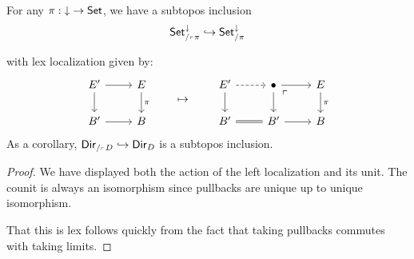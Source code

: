 \begin{thm}
  For any $\pi : \mathbin{\downarrow} \to \operatorname{\mathsf{{Set}}}$, we have a subtopos inclusion
  $$\operatorname{\mathsf{{Set}}}^{\mathbin{\downarrow}}_{/_{\ulcorner} \pi} \hookrightarrow \operatorname{\mathsf{{Set}}}^{\mathbin{\downarrow}}_{/\pi}$$

  with lex localization given by:
  \[
\begin{tikzcd}
E' \arrow[r] \arrow[d] & E \arrow[d, "\pi"] \\
B' \arrow[r]           & B                 
\end{tikzcd} \quad\quad\mapsto\quad\quad
\begin{tikzcd}
E' \arrow[d] \arrow[r, dashed]    & \bullet \arrow[d] \arrow[r] \arrow[rd, phantom, "\ulcorner" very near start] & E \arrow[d, "\pi"] \\
B' \arrow[r, equals] & B' \arrow[r]                           & B                 
\end{tikzcd}
  \]
  As a corollary, $\operatorname{\mathsf{{Dir}}}_{/_{\ulcorner} D} \hookrightarrow \operatorname{\mathsf{{Dir}}}_{D}$ is a
  subtopos inclusion.
\end{thm}
\begin{proof}
We have displayed both the action of the left localization and its unit. The
counit is always an isomorphism since pullbacks are unique up to unique
isomorphism.

That this is lex follows quickly from the fact that taking pullbacks commutes
with taking limits. 
\end{proof}









